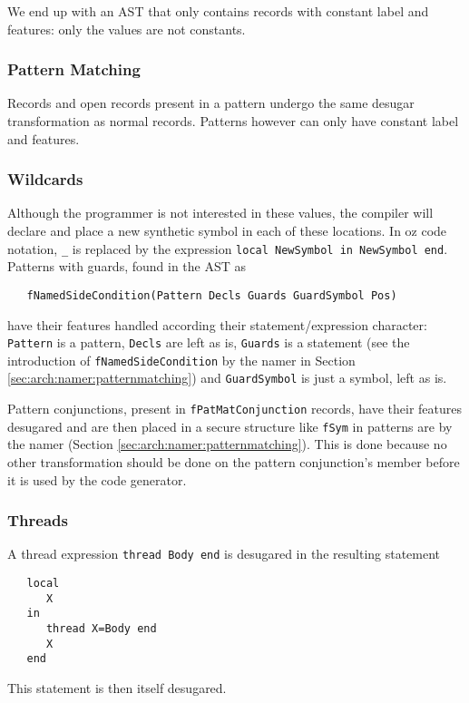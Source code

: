 \documentclass[a4paper]{memoir}
\begin{document}
We end up with an AST that only contains records with constant label and features: only the values are not constants.

\subsubsection{Pattern Matching}
Records and open records present in a pattern undergo the same desugar
transformation as normal records. Patterns however can only have constant label
and features.
\subsubsection{Wildcards}
Although the programmer is not interested in these values, the compiler will declare and place a new synthetic symbol in each of these locations. In oz code notation, \lstinline!_! is replaced by the expression \lstinline!local NewSymbol in NewSymbol end!.
Patterns with guards, found in the AST as 
\begin{lstlisting}
   fNamedSideCondition(Pattern Decls Guards GuardSymbol Pos)
\end{lstlisting}
have their features handled according their statement/expression character:
\lstinline!Pattern! is a pattern, \lstinline!Decls! are left as is,
\lstinline!Guards! is a statement (see the introduction
of \lstinline!fNamedSideCondition! by the namer in Section
\ref{sec:arch:namer:patternmatching}) and \lstinline!GuardSymbol! is just a
symbol, left as is.

Pattern conjunctions, present in \lstinline!fPatMatConjunction! records, have
their features desugared and are then placed in a secure structure like
\lstinline!fSym! in
patterns are by the namer (Section \ref{sec:arch:namer:patternmatching}).
This is done because no other transformation should be done on the pattern
conjunction's member before it is used by the code generator.


\subsubsection{Threads}
A thread expression \lstinline!thread Body end! is desugared in the resulting
statement 
\begin{lstlisting}
   local 
      X 
   in 
      thread X=Body end 
      X 
   end 
\end{lstlisting}

This statement is then itself desugared.
\end{document}
